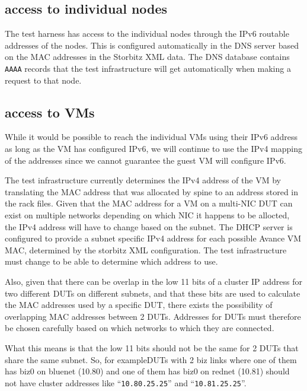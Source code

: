 \documentclass[twoside]{article}
\begin{document}
\subsection{access to individual nodes}

The test harness has access to the individual nodes through the IPv6
routable addresses of the nodes.
This is configured automatically in the DNS server based on the MAC
addresses in the Storbitz XML data.
The DNS database contains \verb+AAAA+ records that the test infrastructure
will get automatically when making a request to that node.

\subsection{access to VMs}

While it would be possible to reach the individual VMs using their IPv6 address
as long as the VM has configured IPv6,
we will continue to use the IPv4 mapping of the addresses since we cannot
guarantee the guest VM will configure IPv6.

The test infrastructure currently determines the IPv4 address of the VM by
translating the MAC address that was allocated by spine to an address
stored in the rack files.
Given that the MAC address for a VM on a multi-NIC DUT can exist on multiple
networks depending on which NIC it happens to be allocted,
the IPv4 address will have to change based on the subnet.
The DHCP server is configured to provide a subnet specific IPv4 address
for each possible Avance VM MAC, determined by the storbitz XML configuration.
The test infrastructure must change to be able to determine which address
to use.

Also, given that there can be overlap in the low 11 bits of a cluster
IP address for two different DUTs on different subnets,
and that these bits are used to calculate the MAC addresses used
by a specific DUT,
there exists the possibility of overlapping MAC addresses between 2 DUTs.
Addresses for DUTs must therefore be chosen carefully based on which networks
to which they are connected.

What this means is that the low 11 bits should not be the same for 2 DUTs
that share the same subnet.
So, for exampleDUTs with 2 biz links where one of them has biz0 on
bluenet (10.80) and one of them has biz0 on rednet (10.81) should not have cluster
addresses like ``\verb+10.80.25.25+'' and ``\verb+10.81.25.25+''.

\end{document}
